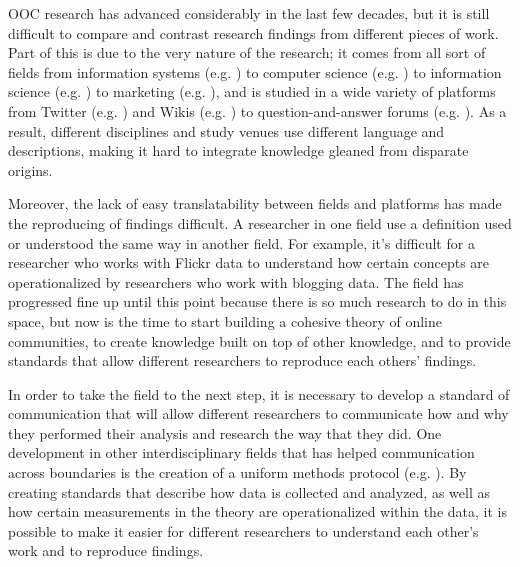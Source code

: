 OOC research has advanced considerably in the last few decades, but it is still difficult to compare and contrast research findings from different pieces of work.   Part of this is due to the very nature of the research; it comes from all sort of fields from information systems (e.g. \cite{ma07through}) to computer science (e.g. \cite{shneiderman00creating}) to information science (e.g. \cite{preece00online}) to marketing (e.g. \cite{kozinets02field}), and is studied in a wide variety of platforms from Twitter (e.g. \cite{vieweg10microblogging}) and Wikis (e.g. \cite{beschastnikh08wikipedian}) to question-and-answer forums (e.g. \cite{zhang07expertise}).  As a result, different disciplines and study venues use different language and descriptions, making it hard to integrate knowledge gleaned from disparate origins.

Moreover, the lack of easy translatability between fields and platforms has made the reproducing of findings difficult.  A researcher in one field use a definition used or understood the same way in another field.  For example, it's difficult for a researcher who works with Flickr data to understand how certain concepts are operationalized by researchers who work with blogging data. The field has progressed fine up until this point because there is so much research to do in this space, but now is the time to start building a cohesive theory of online communities, to create knowledge built on top of other knowledge, and to provide standards that allow different researchers to reproduce each others' findings.

In order to take the field to the next step, it is necessary to develop a standard of communication that will allow different researchers to communicate how and why they performed their analysis and research the way that they did.  One development in other interdisciplinary fields that has helped communication across boundaries is the creation of a uniform methods protocol (e.g. \cite{grimm10odd}).  By creating standards that describe how data is collected and analyzed, as well as how certain measurements in the theory are operationalized within the data, it is possible to make it easier for different researchers to understand each other's work and to reproduce findings.
